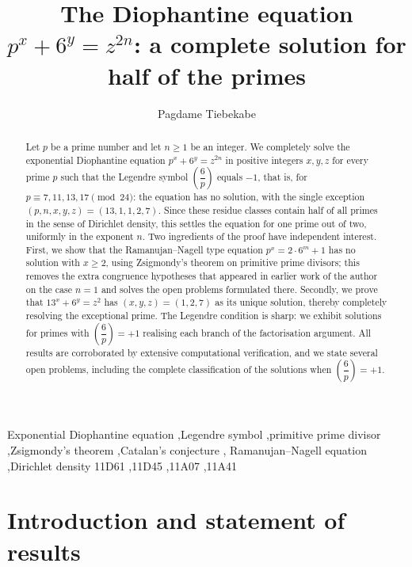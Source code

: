 \documentclass[preprint,12pt]{elsarticle}
\theoremstyle{definition}
\newcommand{\leg}[2]{\left(\dfrac{#1}{#2}\right)}
\begin{document}
\begin{frontmatter}

\title{The Diophantine equation $p^{x}+6^{y}=z^{2n}$: a complete solution
for half of the primes}

\author{Pagdame Tiebekabe}
\address{Department of Mathematics, University of Kara, Kara, Togo}

\begin{abstract}
Let $p$ be a prime number and let $n\geq 1$ be an integer. We completely
solve the exponential Diophantine equation $p^{x}+6^{y}=z^{2n}$ in positive
integers $x,y,z$ for every prime $p$ such that the Legendre symbol
$\leg{6}{p}$ equals $-1$, that is, for $p\equiv 7,11,13,17\pmod{24}$: the
equation has no solution, with the single exception
$(p,n,x,y,z)=(13,1,1,2,7)$. Since these residue classes contain half of all
primes in the sense of Dirichlet density, this settles the equation for one
prime out of two, uniformly in the exponent $n$. Two ingredients of the proof
have independent interest. First, we show that the Ramanujan--Nagell type
equation $p^{x}=2\cdot 6^{m}+1$ has no solution with $x\geq 2$, using
Zsigmondy's theorem on primitive prime divisors; this removes the extra
congruence hypotheses that appeared in earlier work of the author on the case
$n=1$ and solves the open problems formulated there. Secondly, we prove that
$13^{x}+6^{y}=z^{2}$ has $(x,y,z)=(1,2,7)$ as its unique solution, thereby
completely resolving the exceptional prime. The Legendre condition is sharp:
we exhibit solutions for primes with $\leg{6}{p}=+1$ realising each branch of
the factorisation argument. All results are corroborated by extensive
computational verification, and we state several open problems, including the
complete classification of the solutions when $\leg{6}{p}=+1$.
\end{abstract}

\begin{keyword}
Exponential Diophantine equation \sep Legendre symbol \sep primitive prime
divisor \sep Zsigmondy's theorem \sep Catalan's conjecture \sep
Ramanujan--Nagell equation \sep Dirichlet density
\MSC[2020] 11D61 \sep 11D45 \sep 11A07 \sep 11A41
\end{keyword}

\end{frontmatter}


\section{Introduction and statement of results}\label{sec:intro}
\end{document}
